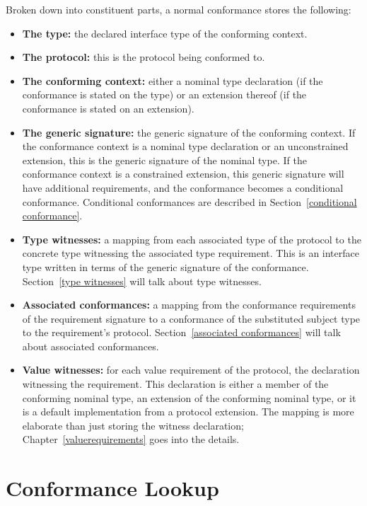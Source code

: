 \documentclass[../generics]{subfiles}
\begin{document}
Broken down into constituent parts, a normal conformance stores the following:
\begin{itemize}
\item \textbf{The type:} the declared interface type of the conforming context.
\item \textbf{The protocol:} this is the protocol being conformed to.
\item \textbf{The conforming context:} either a nominal type declaration (if the conformance is stated on the type) or an extension thereof (if the conformance is stated on an extension).
\item \textbf{The generic signature:} the generic signature of the conforming context. If the conformance context is a nominal type declaration or an unconstrained extension, this is the generic signature of the nominal type. If the conformance context is a constrained extension, this generic signature will have additional requirements, and the conformance becomes a conditional conformance. Conditional conformances are described in Section~\ref{conditional conformance}.
\item \textbf{Type witnesses:} a mapping from each associated type of the protocol to the concrete type witnessing the associated type requirement. This is an interface type written in terms of the generic signature of the conformance. Section~\ref{type witnesses} will talk about type witnesses.
\item \textbf{Associated conformances:} a mapping from the conformance requirements of the requirement signature to a conformance of the substituted subject type to the requirement's protocol. Section~\ref{associated conformances} will talk about associated conformances.
\item \textbf{Value witnesses:} for each value requirement of the protocol, the declaration witnessing the requirement. This declaration is either a member of the conforming nominal type, an extension of the conforming nominal type, or it is a default implementation from a protocol extension. The mapping is more elaborate than just storing the witness declaration; Chapter~\ref{valuerequirements} goes into the details.
\end{itemize}

\section{Conformance Lookup}\label{conformance lookup}
\end{document}
